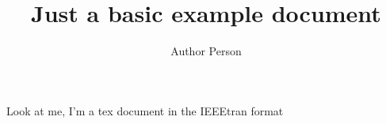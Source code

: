\documentclass[conference]{IEEEtran}
\begin{document}
\title{Just a basic example document}
\author{Author Person}
\maketitle
Look at me, I'm a tex document in the IEEEtran format

\kant
\end{document}
